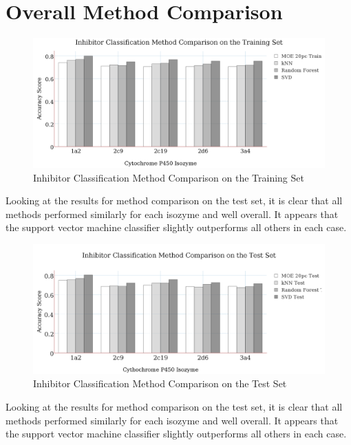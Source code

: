 \section{Overall Method Comparison}

\begin{figure}[H]
\includegraphics[width=1\textwidth]{../img/method_comparison_training_set.png}
\caption{Inhibitor Classification Method Comparison on the Training Set}
\end{figure}

Looking at the results for method comparison on the test set, it is clear that all methods performed similarly for each isozyme and well overall. It appears that the support vector machine classifier slightly outperforms all others in each case.

\begin{figure}[H]
\includegraphics[width=1\textwidth]{../img/method_comparison_test_set.png}
\caption{Inhibitor Classification Method Comparison on the Test Set}
\end{figure}

Looking at the results for method comparison on the test set, it is clear that all methods performed similarly for each isozyme and well overall. It appears that the support vector machine classifier slightly outperforms all others in each case.




